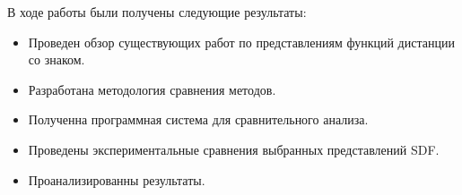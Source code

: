 \documentclass[a4paper,hidelinks,12pt]{article}
\begin{document}
В ходе работы были получены следующие результаты:

\begin{itemize}
	\item Проведен обзор существующих работ по представлениям функций дистанции со знаком.
	\item Разработана методология сравнения методов.
	\item Полученна программная система для сравнительного анализа.
	\item Проведены экспериментальные сравнения выбранных представлений SDF.
	\item Проанализированны результаты.
\end{itemize}

\newpage



\end{document}
